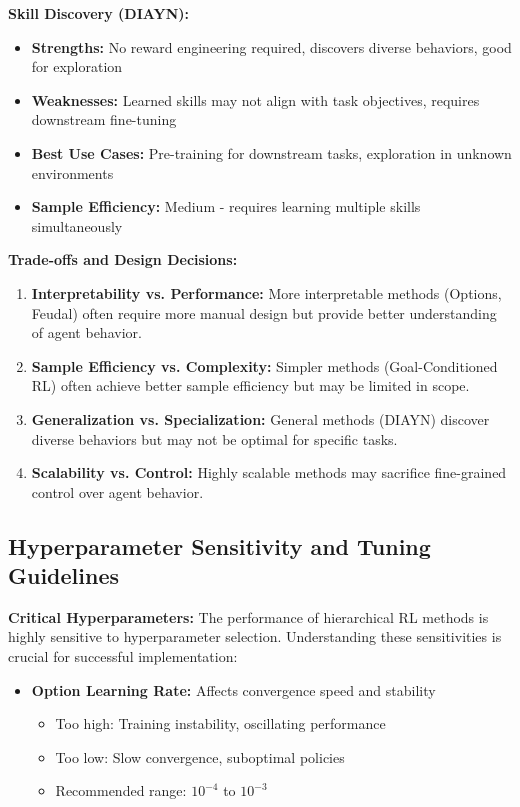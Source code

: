 \documentclass[12pt]{article}
\begin{document}
{{\textbf{Skill Discovery (DIAYN):}
\begin{itemize}
    \item \textbf{Strengths:} No reward engineering required, discovers diverse behaviors, good for exploration
    \item \textbf{Weaknesses:} Learned skills may not align with task objectives, requires downstream fine-tuning
    \item \textbf{Best Use Cases:} Pre-training for downstream tasks, exploration in unknown environments
    \item \textbf{Sample Efficiency:} Medium - requires learning multiple skills simultaneously
\end{itemize}

\textbf{Trade-offs and Design Decisions:}
\begin{enumerate}
    \item \textbf{Interpretability vs. Performance:} More interpretable methods (Options, Feudal) often require more manual design but provide better understanding of agent behavior.
    
    \item \textbf{Sample Efficiency vs. Complexity:} Simpler methods (Goal-Conditioned RL) often achieve better sample efficiency but may be limited in scope.
    
    \item \textbf{Generalization vs. Specialization:} General methods (DIAYN) discover diverse behaviors but may not be optimal for specific tasks.
    
    \item \textbf{Scalability vs. Control:} Highly scalable methods may sacrifice fine-grained control over agent behavior.
\end{enumerate}

\subsection{Hyperparameter Sensitivity and Tuning Guidelines}

\textbf{Critical Hyperparameters:}
The performance of hierarchical RL methods is highly sensitive to hyperparameter selection. Understanding these sensitivities is crucial for successful implementation:

\begin{itemize}
    \item \textbf{Option Learning Rate:} Affects convergence speed and stability
    \begin{itemize}
        \item Too high: Training instability, oscillating performance
        \item Too low: Slow convergence, suboptimal policies
        \item Recommended range: $10^{-4}$ to $10^{-3}$
    \end{itemize}
    

\end{itemize}}}
\end{document}
